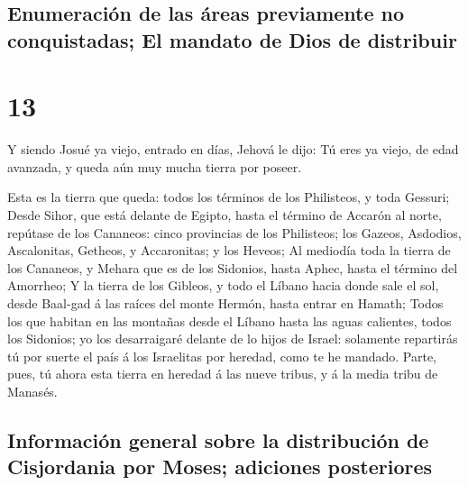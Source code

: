 \hypertarget{enumeraciuxf3n-de-las-uxe1reas-previamente-no-conquistadas-el-mandato-de-dios-de-distribuir}{%
\subsection{Enumeración de las áreas previamente no conquistadas; El
mandato de Dios de
distribuir}\label{enumeraciuxf3n-de-las-uxe1reas-previamente-no-conquistadas-el-mandato-de-dios-de-distribuir}}

\hypertarget{section-12}{%
\section{13}\label{section-12}}

 Y siendo Josué ya viejo, entrado en días, Jehová le dijo:
Tú eres ya viejo, de edad avanzada, y queda aún muy mucha tierra por
poseer.

 Esta es la tierra que queda: todos los términos de los
Philisteos, y toda Gessuri;  Desde Sihor, que está delante
de Egipto, hasta el término de Accarón al norte, repútase de los
Cananeos: cinco provincias de los Philisteos; los Gazeos, Asdodios,
Ascalonitas, Getheos, y Accaronitas; y los Heveos;  Al
mediodía toda la tierra de los Cananeos, y Mehara que es de los
Sidonios, hasta Aphec, hasta el término del Amorrheo;  Y la
tierra de los Gibleos, y todo el Líbano hacia donde sale el sol, desde
Baal-gad á las raíces del monte Hermón, hasta entrar en Hamath;
 Todos los que habitan en las montañas desde el Líbano hasta
las aguas calientes, todos los Sidonios; yo los desarraigaré delante de
lo hijos de Israel: solamente repartirás tú por suerte el país á los
Israelitas por heredad, como te he mandado.  Parte, pues, tú
ahora esta tierra en heredad á las nueve tribus, y á la media tribu de
Manasés.

\hypertarget{informaciuxf3n-general-sobre-la-distribuciuxf3n-de-cisjordania-por-moses-adiciones-posteriores}{%
\subsection{Información general sobre la distribución de Cisjordania por
Moses; adiciones
posteriores}\label{informaciuxf3n-general-sobre-la-distribuciuxf3n-de-cisjordania-por-moses-adiciones-posteriores}}

